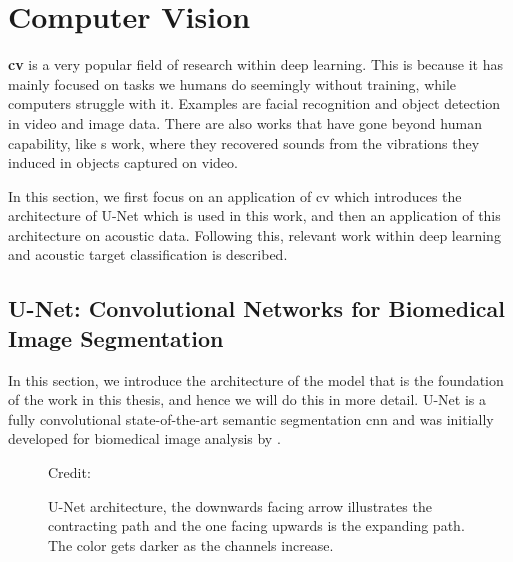 \clearpage





\section{Computer Vision} \label{computer vision}
    \textbf{\gls{cv}} is a very popular field of research within deep learning\cite{voulodimos2018deep_computer_vision}. This is because it has mainly focused on tasks we humans do seemingly without training, while computers struggle with it. Examples are facial recognition and object detection in video and image data. There are also works that have gone beyond human capability, like \citeauthor{davis2014visual_deep_video_audio}s\cite{davis2014visual_deep_video_audio} work, where they recovered sounds from the vibrations they induced in objects captured on video. 

    
    In this section, we first focus on an application of \gls{cv} which introduces the architecture of U-Net which is used in this work, and then an application of this architecture on acoustic data. Following this, relevant work within deep learning and acoustic target classification is described. 

\subsection{U-Net: Convolutional Networks for Biomedical
Image Segmentation} \label{unet}

    In this section, we introduce the architecture of the model that is the foundation of the work in this thesis, and hence we will do this in more detail. U-Net is a fully convolutional state-of-the-art\cite{rajak2021segmentation} semantic segmentation \gls{cnn} and was initially developed for biomedical image analysis by \citeauthor{unet_ronneberger2015}\cite{unet_ronneberger2015}. 
    
    \begin{figure}[H]
        \centering
        
        \caption[U-Net architecture]{U-Net architecture, the downwards facing arrow illustrates the contracting path and the one facing upwards is the expanding path. The color gets darker as the channels increase.}
      	\medskip 
        \label{unet_fig}
        \hspace*{15pt}\hbox{\scriptsize Credit: \citeauthor{unet_ronneberger2015}\cite{unet_ronneberger2015}}
    \end{figure}
    
